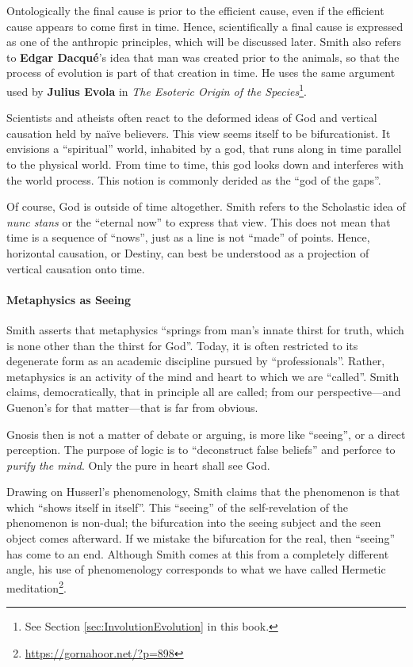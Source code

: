 Ontologically the final cause is prior to the efficient cause, even if the efficient cause appears to come first in time. Hence, scientifically a final cause is expressed as one of the anthropic principles, which will be discussed later. Smith also refers to \textbf{Edgar Dacqué}'s idea that man was created prior to the animals, so that the process of evolution is part of that creation in time. He uses the same argument used by \textbf{Julius Evola} in \textit{The Esoteric Origin of the Species}\footnote{See Section \ref{sec:InvolutionEvolution} in this book.}.

Scientists and atheists often react to the deformed ideas of God and vertical causation held by naïve believers. This view seems itself to be bifurcationist. It envisions a ``spiritual'' world, inhabited by a god, that runs along in time parallel to the physical world. From time to time, this god looks down and interferes with the world process. This notion is commonly derided as the ``god of the gaps''.

Of course, God is outside of time altogether. Smith refers to the Scholastic idea of \emph{nunc stans} or the ``eternal now'' to express that view. This does not mean that time is a sequence of ``nows'', just as a line is not ``made'' of points. Hence, horizontal causation, or Destiny, can best be understood as a projection of vertical causation onto time.

\paragraph{Metaphysics as Seeing}


Smith asserts that metaphysics ``springs from man's innate thirst for truth, which is none other than the thirst for God''. Today, it is often restricted to its degenerate form as an academic discipline pursued by ``professionals''. Rather, metaphysics is an activity of the mind and heart to which we are ``called''. Smith claims, democratically, that in principle all are called; from our perspective---and Guenon's for that matter---that is far from obvious.

Gnosis then is not a matter of debate or arguing, is more like ``seeing'', or a direct perception. The purpose of logic is to ``deconstruct false beliefs'' and perforce to \emph{purify the mind}. Only the pure in heart shall see God.

Drawing on Husserl's phenomenology, Smith claims that the phenomenon is that which ``shows itself in itself''. This ``seeing'' of the self-revelation of the phenomenon is non-dual; the bifurcation into the seeing subject and the seen object comes afterward. If we mistake the bifurcation for the real, then ``seeing'' has come to an end. Although Smith comes at this from a completely different angle, his use of phenomenology corresponds to what we have called Hermetic meditation\footnote{\url{https://gornahoor.net/?p=898}}.

